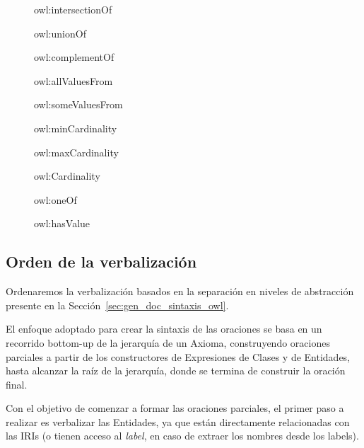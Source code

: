 \begin{figure}
\label{list:constructores_expresiones}
    \begin{itemize}
    \begin{multicols}{2}
        \item owl:intersectionOf
        \item owl:unionOf
        \item owl:complementOf
        \item owl:allValuesFrom
        \item owl:someValuesFrom 
        \item owl:minCardinality
        \item owl:maxCardinality
        \item owl:Cardinality
        \item owl:oneOf
        \item owl:hasValue
        \end{multicols}
    \end{itemize}
\end{figure}

\subsection{Orden de la verbalización}
Ordenaremos la verbalización basados en la separación en niveles de abstracción presente en la Sección~\ref{sec:gen_doc_sintaxis_owl}. 

El enfoque adoptado para crear la sintaxis de las oraciones se basa en un recorrido bottom-up de la jerarquía de un Axioma, construyendo oraciones parciales a partir de los constructores de Expresiones de Clases y de Entidades, hasta alcanzar la raíz de la jerarquía, donde se termina de construir la oración final. 

Con el objetivo de comenzar a formar las oraciones parciales, el primer paso a realizar es verbalizar las Entidades, ya que están directamente relacionadas con las IRIs (o tienen acceso al \emph{label}, en caso de extraer los nombres desde los labels).

